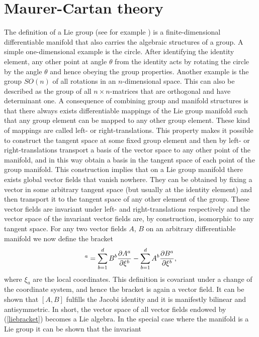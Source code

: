 \section{Maurer-Cartan theory}
\label{sec:maurer}
The definition of a Lie group (see for example \cite{fuchs}) is a finite-dimensional differentiable manifold that also 
carries the algebraic structures of a group. A simple one-dimensional example is the circle. After identifying the 
identity element, any other point at angle $\theta$ from the identity acts by rotating the circle by the angle $\theta$ 
and hence obeying the group properties. Another example is the group $SO(n)$ of all rotations in an $n$-dimensional space. 
This can also be described as the group of all $n \times n$-matrices that are orthogonal and have determinant one. 
A consequence of combining group and manifold structures is that there always exists differentiable mappings of the Lie 
group manifold such that any group element can be mapped to any other group element. These kind of mappings are called left- or right-translations. 
This property makes it possible to construct the tangent space at some fixed group 
element and then by left- or right-translations transport a basis of the vector space to any other point of the manifold, and in this way obtain a basis 
in the tangent space of each point of the group manifold. This construction implies that on a Lie group manifold there exists 
global vector fields that vanish nowhere. They can be obtained by fixing a vector in some arbitrary tangent space (but usually at the identity element) and then 
transport it to the tangent space of any other element of the group. These vector fields are invariant under left- and right-translations respectively and the vector space of the invariant vector fields are, by construction, isomorphic to any tangent space. 
For any two vector fields $A$, $B$ on an arbitrary differentiable manifold we now define the bracket
\begin{equation}
[A,B]^a = \displaystyle\sum_{b=1}^{d}{B^b{\partial A^a \over \partial \xi^b}} - \displaystyle\sum_{b=1}^{d}{A^b{\partial B^a \over \partial \xi^b}},
\label{liebracket}
\end{equation}
where $\xi_a$ are the local coordinates. This definition is covariant under a change of the coordinate system, and hence the bracket is again a vector field. 
It can be shown that $[A,B]$ fulfills the Jacobi identity and it is manifestly bilinear and antisymmetric. In short, the vector space 
of all vector fields endowed by (\ref{liebracket}) becomes a Lie algebra. In the special case where the manifold is a Lie group it can be shown that the invariant 

